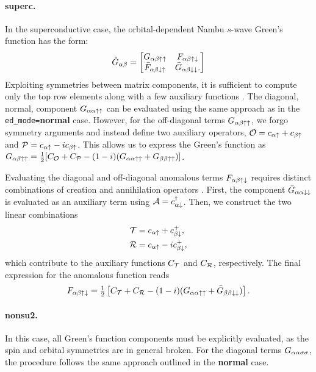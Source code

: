\documentclass[edipack_sp.tex]{subfiles}
\begin{document}
\paragraph{{\bf superc}.}
In the superconductive case, the orbital-dependent Nambu $s$-wave
Green's function has the form:
\begin{equation}
  \label{GFnambu}
  \hat{G}_{\alpha\beta} =
  \begin{bmatrix}
    G_{\alpha\beta\uparrow\uparrow} & F_{\alpha\beta\uparrow\downarrow} \\
    \bar{F}_{\alpha\beta\downarrow\uparrow} & \bar{G}_{\alpha\beta\downarrow\downarrow}.
  \end{bmatrix}  
\end{equation}
Exploiting symmetries between matrix components, it is 
sufficient to compute only the top row elements along with 
a few auxiliary functions \cite{Capone2001PRL,Capone2002Science,Capone2004PRLsc,Toschi2005NJP,Toschi2005PRB,Capone2009RMP}.
%
The diagonal, normal, component $G_{\alpha\alpha\uparrow\uparrow}$ can be 
evaluated using the same approach as in the {\tt ed\_mode=}{\bf normal} 
case. However, for the off-diagonal terms $G_{\alpha\beta\uparrow\uparrow}$, 
we forgo symmetry arguments and instead define two 
auxiliary operators, ${\cal O} = c_{\alpha\uparrow} + c_{\beta\uparrow}$ and 
${\cal P} = c_{\alpha\uparrow} - i c_{\beta\uparrow}$. This allows us to express 
the Green's function as
$G_{\alpha\beta\uparrow\uparrow}=\tfrac{1}{2}[C_{\cal O} + C_{\cal P} -
(1-i)(G_{\alpha\alpha\uparrow\uparrow}+G_{\beta\beta\uparrow\uparrow})]$.

Evaluating the diagonal and off-diagonal anomalous terms 
$F_{\alpha\beta\uparrow\downarrow}$ requires distinct combinations of 
creation and annihilation operators \cite{Capone2001PRL,Capone2002Science,Capone2004PRLsc,Toschi2005NJP,Toschi2005PRB}. First, the component 
$\bar{G}_{\alpha\alpha\downarrow\downarrow}$ is evaluated as an auxiliary term 
using ${\cal A} = c^\dagger_{\alpha\downarrow}$. Then, we construct the two  
linear combinations
\begin{align*}
{\cal T} &= c_{\alpha\uparrow} + c^+_{\beta\downarrow}, \\
{\cal R} &= c_{\alpha\uparrow} - i c^+_{\beta\downarrow},
\end{align*}
which contribute to the auxiliary functions $C_{\cal T}$ and 
$C_{\cal R}$, respectively. The final expression for the 
anomalous function reads
\begin{equation}
F_{\alpha\beta\uparrow\downarrow} = \tfrac{1}{2} \left[ C_{\cal T} + C_{\cal R} - 
(1-i)(G_{\alpha\alpha\uparrow\uparrow} + \bar{G}_{\beta\beta\downarrow\downarrow}) \right].
\end{equation}



\paragraph{{\bf nonsu2}.}
In this case, all Green's function components 
must be explicitly evaluated, as the spin and orbital 
symmetries are in general broken. For the diagonal terms 
$G_{\alpha\alpha\sigma\sigma}$, the procedure follows the same approach 
outlined in the {\bf normal} case. 
\end{document}
